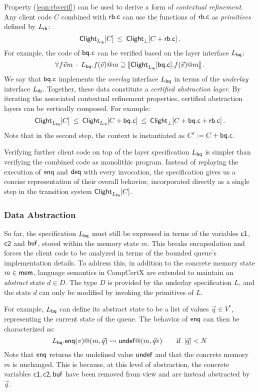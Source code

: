 \documentclass[acmsmall,review,anonymous]{acmart}\settopmatter{printfolios=true,printccs=false,printacmref=false}
\begin{document}
Property (\ref{eqn:rbverif}) can be used to derive a form of \emph{contextual refinement}.
Any client code $C$ combined with $ \mathsf{rb.c} $
can use the functions of $ \mathsf{rb.c} $ as \emph{primitives}
defined by $L_{ \mathsf{rb} }$:
\[
   \mathsf{Clight} _{L_{ \mathsf{rb} }}[C] \:\le\:
   \mathsf{Clight} _\bot[C +  \mathsf{rb.c} ]
  \,.
\]
For example, the code of $ \mathsf{bq.c} $
can be verified
based on the layer interface $L_{ \mathsf{bq} }$:
\[
  \forall f \vec{v} m \:\cdot\:
    L_{ \mathsf{bq} }.f(\vec{v})@m \supseteq
    \llbracket
     \mathsf{Clight} _{L_{ \mathsf{rb} }}[ \mathsf{bq.c} ].f(\vec{v})@m
    \rrbracket
    \,.
\]
We say that $ \mathsf{bq.c} $ implements the \emph{overlay} interface $L_{ \mathsf{bq} }$
in terms of the \emph{underlay} interface $L_{ \mathsf{rb} }$.
Together, these data constitute a \emph{certified abstraction layer}.
By iterating the associated contextual refinement properties,
certified abstraction layers can be vertically composed.
For example:
\[
   \mathsf{Clight} _{L_{ \mathsf{bq} }}[C] \:\le\:
   \mathsf{Clight} _{L_{ \mathsf{rb} }}[C +  \mathsf{bq.c} ] \:\le\:
   \mathsf{Clight} _\bot[C +  \mathsf{bq.c}  +  \mathsf{rb.c} ]
  \,.
\]
Note that in the second step,
the context is instantiated as $C' := C +  \mathsf{bq.c} $.

Verifying further client code on top of the layer specification $L_{ \mathsf{bq} }$
is simpler than verifying the combined code as monolithic program.
Instead of replaying the execution of
$ \mathsf{enq} $ and $ \mathsf{deq} $
with every invocation,
the specification gives us a concise representation of their overall behavior,
incorporated directly as a single step in the transition system
$ \mathsf{Clight} _{L_{ \mathsf{bq} }}[C]$.

\subsubsection{Data Abstraction}

So far, the specification $L_{ \mathsf{bq} }$
must still be expressed in terms
of the variables $ \mathsf{c1} $, $ \mathsf{c2} $ and $ \mathsf{buf} $,
stored within the memory state $m$.
This breaks encapsulation and forces the client code
to be analyzed in terms of the bounded queue's implementation details.
To address this,
in addition to the concrete memory state $m \in  \mathsf{mem} $,
language semantics in CompCertX are extended to maintain
an \emph{abstract} state $d \in D$.
The type $D$ is provided by the underlay specification $L$,
and the state $d$ can only be modified by invoking the primitives of $L$.

For example,
$L_{ \mathsf{bq} }$ can define its abstract state to be
a list of values $\vec{q} \in V^*$,
representing the current state of the queue.
The behavior of $ \mathsf{enq} $ can then be characterized as:
\[
  L_{ \mathsf{bq} }. \mathsf{enq} (v)@(m, \vec{q})
  \leadsto
   \mathsf{undef} @(m, \vec{q}v)
  \qquad
  \text{if }\: |\vec{q}| < N
\]
Note that $ \mathsf{enq} $ returns the undefined value $ \mathsf{undef} $
and that the concrete memory $m$ is unchanged.
This is because, at this level of abstraction,
the concrete variables $ \mathsf{c1} ,  \mathsf{c2} ,  \mathsf{buf} $
have been removed from view
and are instead abstracted by $\vec{q}$.
\end{document}
